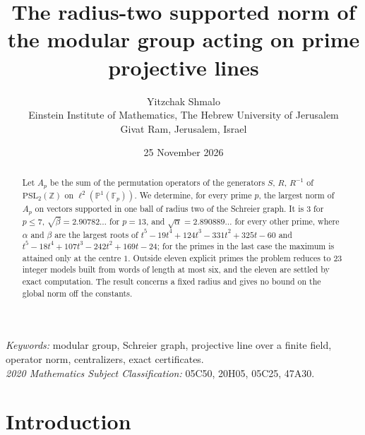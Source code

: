 \documentclass[11pt,a4paper]{article}
\title{The radius-two supported norm of the modular group acting on prime projective lines}
\author{Yitzchak Shmalo\\[0.4em]
\small Einstein Institute of Mathematics, The Hebrew University of Jerusalem\\
\small Givat Ram, Jerusalem, Israel}
\date{25 November 2026}
\numberwithin{equation}{section}
\theoremstyle{remark}
\newcommand{\Z}{\mathbb Z}
\newcommand{\F}{\mathbb F}
\newcommand{\PP}{\mathbb P}
\newcommand{\PSL}{\mathrm{PSL}}
\begin{document}
\maketitle
\thispagestyle{fancy}

\begin{abstract}
Let $A_p$ be the sum of the permutation operators of the generators $S$, $R$, $R^{-1}$ of $\PSL_2(\Z)$ on $\ell^2(\PP^1(\F_p))$. We determine, for every prime $p$, the largest norm of $A_p$ on vectors supported in one ball of radius two of the Schreier graph. It is $3$ for $p\le7$, $\sqrt\beta=2.90782\ldots$ for $p=13$, and $\sqrt\alpha=2.890889\ldots$ for every other prime, where $\alpha$ and $\beta$ are the largest roots of $t^5-19t^4+124t^3-331t^2+325t-60$ and $t^5-18t^4+107t^3-242t^2+169t-24$; for the primes in the last case the maximum is attained only at the centre $1$. Outside eleven explicit primes the problem reduces to $23$ integer models built from words of length at most six, and the eleven are settled by exact computation. The result concerns a fixed radius and gives no bound on the global norm off the constants.
\end{abstract}

\noindent\textit{Keywords:} modular group, Schreier graph, projective line over a finite field, operator norm, centralizers, exact certificates.\\
\textit{2020 Mathematics Subject Classification:} 05C50, 20H05, 05C25, 47A30.

\section{Introduction}\label{sec:intro}
\end{document}
